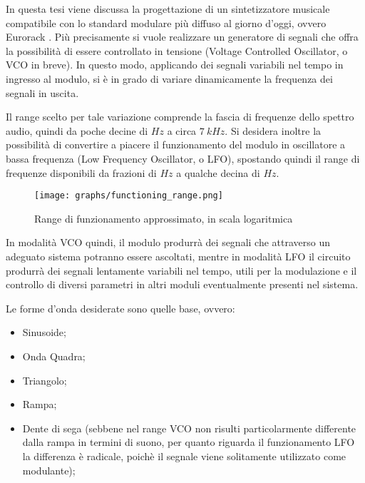 

In questa tesi viene discussa la progettazione di un sintetizzatore musicale compatibile con
lo standard modulare più diffuso al giorno d'oggi, ovvero Eurorack \cite{eurorack}. Più
precisamente si vuole realizzare un generatore di segnali che offra la possibilità di essere
controllato in tensione (Voltage Controlled Oscillator, o VCO in breve). In questo modo,
applicando dei segnali variabili nel tempo in ingresso al modulo, si è in grado di variare
dinamicamente la frequenza dei segnali in uscita.

Il range scelto per tale variazione comprende la fascia di frequenze dello spettro audio,
quindi da poche decine di $Hz$ a circa $7\ kHz$. Si desidera inoltre la possibilità di
convertire a piacere il funzionamento del modulo in oscillatore a bassa frequenza (Low Frequency
Oscillator, o LFO), spostando quindi il range di frequenze disponibili da frazioni di
$Hz$ a qualche decina di $Hz$.
\medskip

\begin{figure}[H]
    \centering
    \texttt{[image: graphs/functioning\_range.png]}
    \caption{Range di funzionamento approssimato, in scala logaritmica}
    \label{functioning_range}
\end{figure}

In modalità VCO quindi, il modulo produrrà dei segnali che attraverso un adeguato sistema
potranno essere ascoltati, mentre in modalità LFO il circuito produrrà dei segnali lentamente
variabili nel tempo, utili per la modulazione e il controllo di diversi parametri in altri
moduli eventualmente presenti nel sistema.

Le forme d'onda desiderate sono quelle base, ovvero:

\begin{itemize}
    \item Sinusoide;
    \item Onda Quadra;
    \item Triangolo;
    \item Rampa;
    \item Dente di sega (sebbene nel range VCO non risulti particolarmente differente dalla
          rampa in termini di suono, per quanto riguarda il funzionamento LFO la differenza
          è radicale, poichè il segnale viene solitamente utilizzato come modulante);
\end{itemize}

